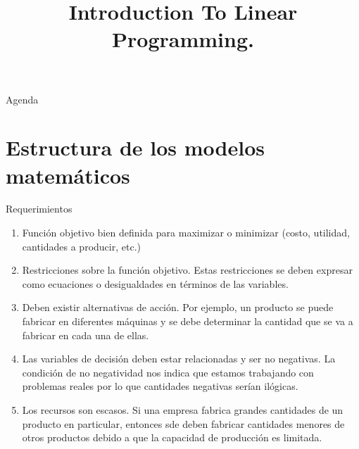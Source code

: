 \documentclass[../slides.tex]{subfiles}
\title{Introduction To Linear Programming.}
\begin{document}
\begin{frame}
  \maketitle
\end{frame}


     \begin{frame}{Agenda}
   \tableofcontents
 \end{frame}



\section{Estructura de los modelos matemáticos}
\label{sec:formulations}

\begin{frame}{Requerimientos}
  \begin{enumerate} \parskip2mm \justifying
  \item<only@1> Función objetivo bien definida para maximizar o minimizar (costo, utilidad, cantidades a producir, etc.) 
  \item<only@1> Restricciones sobre la función objetivo. Estas restricciones se deben expresar como ecuaciones o desigualdades en términos de las variables.
  \item<only@1> Deben existir alternativas de acción. Por ejemplo, un producto se puede fabricar en diferentes máquinas y se debe determinar la cantidad que se va a fabricar en cada una de ellas. 
  \item<only@2> Las variables de decisión deben estar relacionadas y ser no negativas. La condición de no negatividad nos indica que estamos trabajando con problemas reales por lo que cantidades negativas serían ilógicas.
  \item<only@2> Los recursos son escasos. Si una empresa fabrica grandes cantidades de un producto en particular, entonces sde deben fabricar cantidades menores de otros productos debido a que la capacidad de producción es limitada.
  \end{enumerate}
\end{frame}
\end{document}
